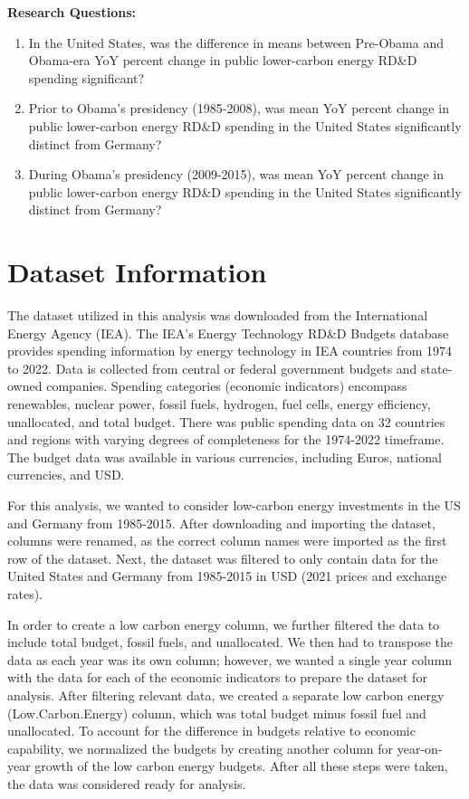 \documentclass[
  12pt,
]{article}
\begin{document}
\textbf{Research Questions:}

\begin{enumerate}
\def\labelenumi{\arabic{enumi}.}
\item
  In the United States, was the difference in means between Pre-Obama
  and Obama-era YoY percent change in public lower-carbon energy RD\&D
  spending significant?
\item
  Prior to Obama's presidency (1985-2008), was mean YoY percent change
  in public lower-carbon energy RD\&D spending in the United States
  significantly distinct from Germany?
\item
  During Obama's presidency (2009-2015), was mean YoY percent change in
  public lower-carbon energy RD\&D spending in the United States
  significantly distinct from Germany?
\end{enumerate}

\newpage

\hypertarget{dataset-information}{%
\section{Dataset Information}\label{dataset-information}}

The dataset utilized in this analysis was downloaded from the
International Energy Agency (IEA). The IEA's Energy Technology RD\&D
Budgets database provides spending information by energy technology in
IEA countries from 1974 to 2022. Data is collected from central or
federal government budgets and state-owned companies. Spending
categories (economic indicators) encompass renewables, nuclear power,
fossil fuels, hydrogen, fuel cells, energy efficiency, unallocated, and
total budget. There was public spending data on 32 countries and regions
with varying degrees of completeness for the 1974-2022 timeframe. The
budget data was available in various currencies, including Euros,
national currencies, and USD.

For this analysis, we wanted to consider low-carbon energy investments
in the US and Germany from 1985-2015. After downloading and importing
the dataset, columns were renamed, as the correct column names were
imported as the first row of the dataset. Next, the dataset was filtered
to only contain data for the United States and Germany from 1985-2015 in
USD (2021 prices and exchange rates).

In order to create a low carbon energy column, we further filtered the
data to include total budget, fossil fuels, and unallocated. We then had
to transpose the data as each year was its own column; however, we
wanted a single year column with the data for each of the economic
indicators to prepare the dataset for analysis. After filtering relevant
data, we created a separate low carbon energy (Low.Carbon.Energy)
column, which was total budget minus fossil fuel and unallocated. To
account for the difference in budgets relative to economic capability,
we normalized the budgets by creating another column for year-on-year
growth of the low carbon energy budgets. After all these steps were
taken, the data was considered ready for analysis.
\end{document}
